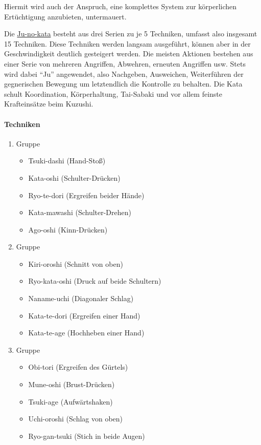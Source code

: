 \documentclass[justified, a4paper, notitlepage, captions=tableheading, nobib]{tufte-handout}
\begin{document}
Hiermit wird auch der Anspruch, eine komplettes System zur körperlichen Ertüchtigung anzubieten, untermauert.

Die \hyperref[org1f25ea6]{Ju-no-kata} besteht aus drei Serien zu je 5 Techniken, umfasst also insgesamt 15 Techniken. 
Diese Techniken werden langsam ausgeführt, können aber in der Geschwindigkeit deutlich gesteigert werden. 
Die meisten Aktionen bestehen aus einer Serie von mehreren Angriffen, Abwehren, erneuten Angriffen usw. 
Stets wird dabei "`Ju"' angewendet, also Nachgeben, Ausweichen, Weiterführen der gegnerischen Bewegung um letztendlich die Kontrolle zu behalten. 
Die Kata schult Koordination, Körperhaltung, Tai-Sabaki und vor allem feinste Krafteinsätze beim Kuzushi.

\paragraph{Techniken}
\label{sec:org02059ae}
\begin{enumerate}
\item Gruppe
\begin{itemize}
\item Tsuki-dashi (Hand-Stoß)
\item Kata-oshi (Schulter-Drücken)
\item Ryo-te-dori (Ergreifen beider Hände)
\item Kata-mawashi (Schulter-Drehen)
\item Ago-oshi (Kinn-Drücken)
\end{itemize}
\item Gruppe
\begin{itemize}
\item Kiri-oroshi (Schnitt von oben)
\item Ryo-kata-oshi (Druck auf beide Schultern)
\item Naname-uchi (Diagonaler Schlag)
\item Kata-te-dori (Ergreifen einer Hand)
\item Kata-te-age (Hochheben einer Hand)
\end{itemize}
\item Gruppe
\begin{itemize}
\item Obi-tori (Ergreifen des Gürtels)
\item Mune-oshi (Brust-Drücken)
\item Tsuki-age (Aufwärtshaken)
\item Uchi-oroshi (Schlag von oben)
\item Ryo-gan-tsuki (Stich in beide Augen)
\end{itemize}
\end{enumerate}
\end{document}
